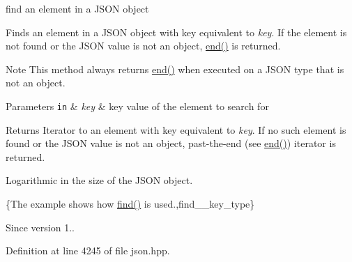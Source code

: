 find an element in a J\+S\+O\+N object 

Finds an element in a J\+S\+O\+N object with key equivalent to {\itshape key}. If the element is not found or the J\+S\+O\+N value is not an object, \hyperlink{classnlohmann_1_1basic__json_a12ccf14d39ddae52f6c7e126105a230b}{end()} is returned.

\begin{DoxyNote}{Note}
This method always returns \hyperlink{classnlohmann_1_1basic__json_a12ccf14d39ddae52f6c7e126105a230b}{end()} when executed on a J\+S\+O\+N type that is not an object.
\end{DoxyNote}

\begin{DoxyParams}[1]{Parameters}
\mbox{\tt in}  & {\em key} & key value of the element to search for\\
\hline
\end{DoxyParams}
\begin{DoxyReturn}{Returns}
Iterator to an element with key equivalent to {\itshape key}. If no such element is found or the J\+S\+O\+N value is not an object, past-\/the-\/end (see \hyperlink{classnlohmann_1_1basic__json_a12ccf14d39ddae52f6c7e126105a230b}{end()}) iterator is returned.
\end{DoxyReturn}
Logarithmic in the size of the J\+S\+O\+N object.

\{The example shows how {\ttfamily \hyperlink{classnlohmann_1_1basic__json_affe7e160e7bb06eed83c8b437af4692f}{find()}} is used.,find\+\_\+\+\_\+key\+\_\+type\}

\begin{DoxySince}{Since}
version 1.. 
\end{DoxySince}


Definition at line 4245 of file json.\+hpp.

\hypertarget{classnlohmann_1_1basic__json_aaa687595d7627925fbf6d6eb97e2021e}{}
